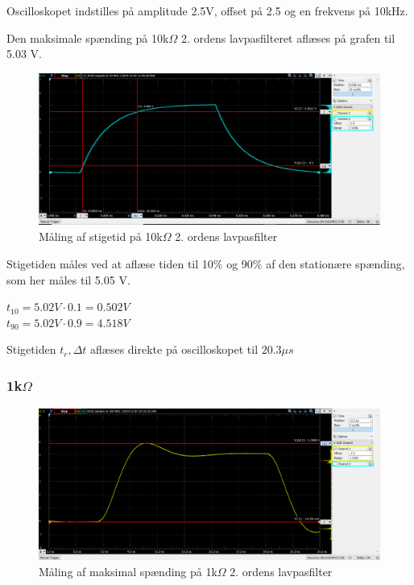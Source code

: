 Oscilloskopet indstilles  på amplitude 2.5V, offset på 2.5 og en frekvens på 10kHz.

Den maksimale spænding på 10k$\Omega$ 2. ordens lavpasfilteret aflæses på grafen til 5.03 V. 

\begin{figure}[h!]
\begin{center}
\includegraphics[height=5cm]{E_Fig/Rea_2_10_stigetid}
\caption{Måling af stigetid på 10k$\Omega$ 2. ordens lavpasfilter}
\label{Rea_2_10_stigetid}
\end{center}
\end{figure}


Stigetiden måles ved at aflæse tiden til 10$\%$ og 90$\%$ af den stationære spænding, som her måles til 5.05 V.\\
\begin{center}
$t_{10}=5.02 V \cdot 0.1 = 0.502 V$
\\    
$t_{90}=5.02 V \cdot 0.9 = 4.518 V$
\end{center}
Stigetiden $t_r, \Delta t$ aflæses direkte på oscilloskopet til $20.3 \mu s$

\subsubsection{1k$\Omega$}

\begin{figure}[h!]
\begin{center}
\includegraphics[height=5cm]{E_Fig/Rea_2_1_max}
\caption{Måling af maksimal spænding på 1k$\Omega$ 2. ordens lavpasfilter}
\label{Rea_2_1_max}
\end{center}
\end{figure}

